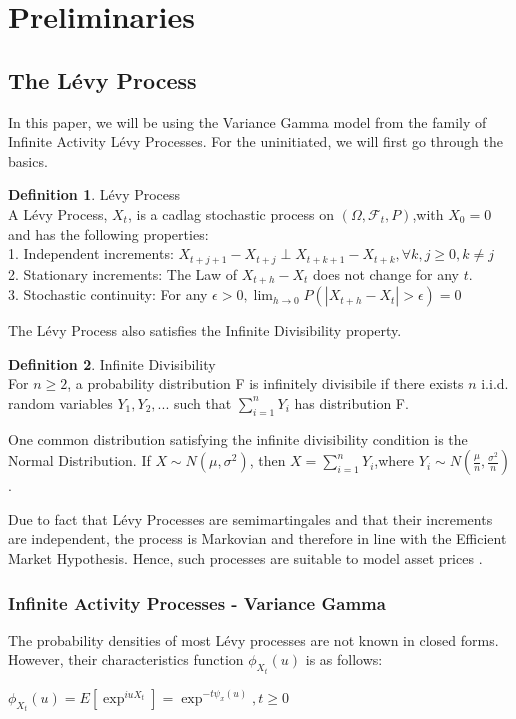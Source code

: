 \documentclass[12pt]{article}
\theoremstyle{definition}
\newtheorem{definition}{Definition}[section]
\begin{document}
\section{Preliminaries}

\subsection{The L\'{e}vy Process}
In this paper, we will be using the Variance Gamma model from the family of Infinite Activity L\'{e}vy Processes. For the uninitiated, we will first go through the basics.
\theoremstyle{definition}
\begin{definition}{L\'{e}vy Process}\\
A L\'{e}vy Process, $X_{t}$, is a cadlag stochastic process on $(\Omega,\mathcal{F}_{t},P)$,with $X_{0}=0$ and has the following properties:\\
1. Independent increments: $X_{t+j+1} - X_{t+j} \perp X_{t+k+1} - X_{t+k}, \forall k,j \ge 0 , k \neq j$\\
2. Stationary increments: The Law of $X_{t+h} - X_{t}$ does not change for any $t$.\\
3. Stochastic continuity: For any $\epsilon>0, \lim_{h\rightarrow 0} P(|X_{t+h}-X_{t}|>\epsilon) = 0$
\end{definition}
\justify The L\'{e}vy Process also satisfies the Infinite Divisibility property.
\begin{definition}{Infinite Divisibility} \\
For $n\ge 2$, a probability distribution F is infinitely divisibile if there exists $n$ i.i.d. random variables $Y_{1},Y_{2},...$ such that $\sum_{i=1}^{n} Y_{i}$ has distribution F.
\end{definition}
\justify One common distribution satisfying the infinite divisibility condition is the Normal Distribution. If $X \sim N(\mu,\sigma^{2})$, then $X = \sum_{i=1}^{n} Y_{i}$,where $Y_{i} \sim N(\frac{\mu}{n},\frac{\sigma^{2}}{n})$.

\justify Due to fact that L\'{e}vy Processes are semimartingales and that their increments are independent, the process is Markovian and therefore in line with the Efficient Market Hypothesis. Hence, such processes are suitable to model asset prices \citep{li2008bayesian}. 
\subsubsection{Infinite Activity Processes - Variance Gamma}
The probability densities of most L\'{e}vy processes are not known in closed forms. However, their characteristics function $\phi_{X_{t}}(u)$ is as follows:
\begin{center}
$
\phi_{X_{t}}(u) = E[\exp^{iuX_{t}}] = \exp^{-t\psi_{x}(u)},t\ge 0
$
\end{center}
\end{document}
